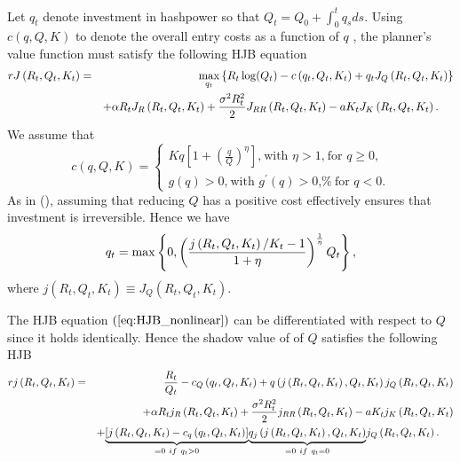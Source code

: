 \documentclass[12pt, a4paper]{article}
\begin{document}
Let $q_{t}$ denote investment in hashpower so that $Q_{t}=Q_{0}+\int_{0}^{t} q_{s}ds$. Using $%
c\left( q,Q,K\right) $ to denote the overall entry costs as a function of $q$%
, the planner's value function must satisfy the following HJB equation
\begin{eqnarray}
rJ\left( R_{t},Q_{t},K_{t}\right)  &=&\max_{q_{t}}\left\{ R_{t}\log
(Q_{t})-c\left( q_{t},Q_{t},K_{t}\right) +q_{t}J_{Q}\left(
R_{t},Q_{t},K_{t}\right) \right\}   \notag \\
&&+\alpha R_{t}J_{R}\left( R_{t},Q_{t},K_{t}\right) +\frac{\sigma
^{2}R_{t}^{2}}{2}J_{RR}\left( R_{t},Q_{t},K_{t}\right) -aK_{t}J_{K}\left(
R_{t},Q_{t},K_{t}\right).~~~~
\label{eq:HJB_nonlinear}
\end{eqnarray}%
We assume that%
\begin{equation*}
c\left( q,Q,K\right) =\left\{
\begin{array}{l}
Kq\left[ 1+\left( \frac{q}{Q}\right) ^{\eta }\right] \text{,}\ \text{with }%
\eta >1\text{,}\ \text{for }q\geq 0\text{,} \\
g\left( q\right) >0\text{,}\ \text{with }g^{\prime }\left( q\right) >0\text{,%
}\ \text{for }q<0.%
\end{array}%
\right.
\end{equation*}%
As in \citeauthor{Abel} (\citeyear{Abel}), assuming that reducing $Q$ has a
positive cost effectively ensures that investment is irreversible. Hence we
have%
\begin{equation}
q_{t}=\max \left\{ 0,\left( \frac{j\left( R_{t},Q_{t},K_{t}\right) /K_{t}-1}{%
1+\eta }\right) ^{\frac{1}{\eta }}Q_{t}\right\} ,
\label{eq:Opt_invt_nonlinear}
\end{equation}%
where $j\left( R_{t},Q_{t},K_{t}\right) \equiv J_{Q}\left(
R_{t},Q_{t},K_{t}\right) .$

The HJB equation $\left( \ref{eq:HJB_nonlinear}\right)$ can be differentiated
with respect to $Q$ since it holds identically. Hence the shadow value of
of $Q$ satisfies the following HJB
\begin{eqnarray}
rj\left( R_{t},Q_{t},K_{t}\right)  &=&\frac{R_{t}}{Q_{t}}-c_{Q}\left(
q_{t},Q_{t},K_{t}\right) +q\left( j\left( R_{t},Q_{t},K_{t}\right)
,Q_{t},K_{t}\right) j_{Q}\left( R_{t},Q_{t},K_{t}\right)   \notag \\
&&+\alpha R_{t}j_{R}\left( R_{t},Q_{t},K_{t}\right) +\frac{\sigma
^{2}R_{t}^{2}}{2}j_{RR}\left( R_{t},Q_{t},K_{t}\right) -aK_{t}j_{K}\left(
R_{t},Q_{t},K_{t}\right)   \notag \\
&&+\underset{=0\ if\ q_{t}>0}{\underbrace{\left[ j\left(
R_{t},Q_{t},K_{t}\right) -c_{q}\left( q_{t},Q_{t},K_{t}\right) \right] }}%
\underset{=0\ if\ q_{t}=0}{\underbrace{q_{j}\left( j\left(
R_{t},Q_{t},K_{t}\right) ,Q_{t},K_{t}\right) }}j_{Q}\left(
R_{t},Q_{t},K_{t}\right) .~~~~  \label{eq:HJB_tobinq_non_linear}
\end{eqnarray}%
\end{document}
